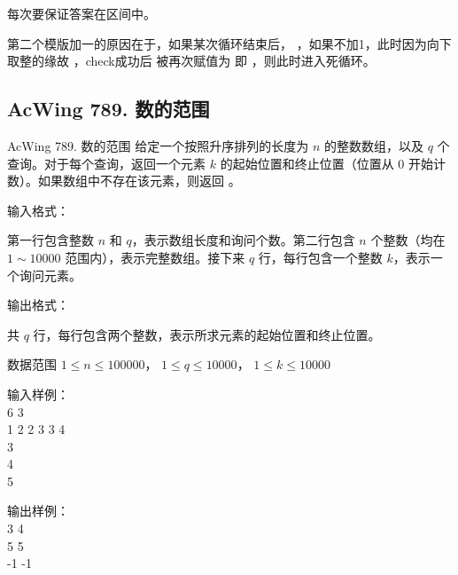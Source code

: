 \begin{keypoint}
    每次要保证答案在区间中。

    第二个模版加一的原因在于，如果某次循环结束后， ，如果不加1，此时因为向下取整的缘故 ，check成功后 被再次赋值为 即 ，则此时进入死循环。
\end{keypoint}

\subsection{AcWing 789. 数的范围}
\begin{titledbox}{AcWing 789. 数的范围}
    给定一个按照升序排列的长度为 $n$ 的整数数组，以及 $q$ 个查询。对于每个查询，返回一个元素 $k$ 的起始位置和终止位置（位置从 $0$ 开始计数）。如果数组中不存在该元素，则返回 。

    输入格式：

    第一行包含整数 $n$ 和 $q$，表示数组长度和询问个数。第二行包含 $n$ 个整数（均在 $1 \sim 10000$ 范围内），表示完整数组。接下来 $q$ 行，每行包含一个整数 $k$，表示一个询问元素。

    输出格式：

    共 $q$ 行，每行包含两个整数，表示所求元素的起始位置和终止位置。

    数据范围
    $1 \le n \le 100000$，
    $1 \le q \le 10000$，
    $1 \le k \le 10000$

    \begin{minipage}[t]{.5\textwidth}
        输入样例：\\
        6 3 \\
        1 2 2 3 3 4 \\
        3 \\
        4 \\
        5
    \end{minipage}%
    \begin{minipage}[t]{.5\textwidth}
        输出样例：\\
        3 4 \\
        5 5 \\
        -1 -1
    \end{minipage}
\end{titledbox}


